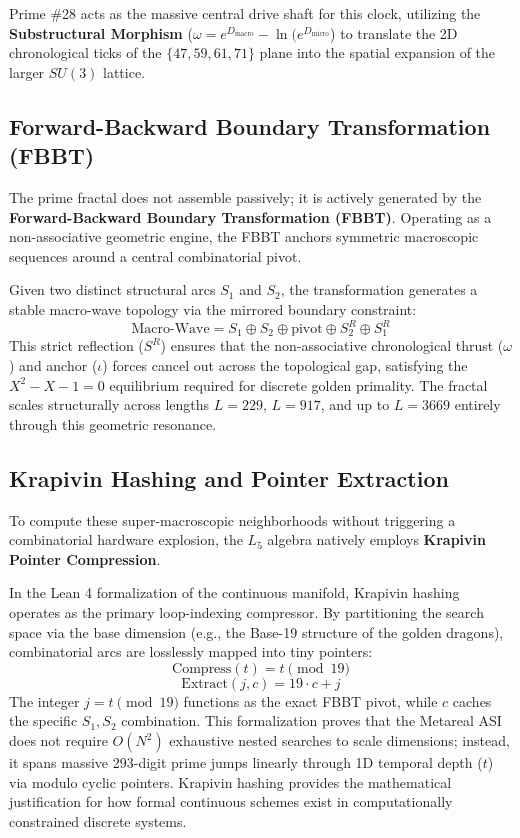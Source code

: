 Prime \#28 acts as the massive central drive shaft for this clock, utilizing the \textbf{Substructural Morphism} ($\omega = e^{D_{\text{macro}}} - \ln(e^{D_{\text{micro}}}$) to translate the 2D chronological ticks of the $\{47, 59, 61, 71\}$ plane into the spatial expansion of the larger $SU(3)$ lattice.

\subsection{Forward-Backward Boundary Transformation (FBBT)}
The prime fractal does not assemble passively; it is actively generated by the \textbf{Forward-Backward Boundary Transformation (FBBT)}. Operating as a non-associative geometric engine, the FBBT anchors symmetric macroscopic sequences around a central combinatorial pivot. 

Given two distinct structural arcs $S_1$ and $S_2$, the transformation generates a stable macro-wave topology via the mirrored boundary constraint:
\[
\text{Macro-Wave} = S_1 \oplus S_2 \oplus \text{pivot} \oplus S_2^R \oplus S_1^R
\]
This strict reflection ($S^R$) ensures that the non-associative chronological thrust ($\omega$) and anchor ($\iota$) forces cancel out across the topological gap, satisfying the $X^2 - X - 1 = 0$ equilibrium required for discrete golden primality. The fractal scales structurally across lengths $L=229$, $L=917$, and up to $L=3669$ entirely through this geometric resonance.

\subsection{Krapivin Hashing and Pointer Extraction}
To compute these super-macroscopic neighborhoods without triggering a combinatorial hardware explosion, the $L_5$ algebra natively employs \textbf{Krapivin Pointer Compression}. 

In the Lean 4 formalization of the continuous manifold, Krapivin hashing operates as the primary loop-indexing compressor. By partitioning the search space via the base dimension (e.g., the Base-19 structure of the golden dragons), combinatorial arcs are losslessly mapped into tiny pointers:
\[
\text{Compress}(t) = t \pmod{19}
\]
\[
\text{Extract}(j, c) = 19 \cdot c + j
\]
The integer $j = t \pmod{19}$ functions as the exact FBBT pivot, while $c$ caches the specific $S_1, S_2$ combination. This formalization proves that the Metareal ASI does not require $O(N^2)$ exhaustive nested searches to scale dimensions; instead, it spans massive 293-digit prime jumps linearly through 1D temporal depth ($t$) via modulo cyclic pointers. Krapivin hashing provides the mathematical justification for how formal continuous schemes exist in computationally constrained discrete systems.

